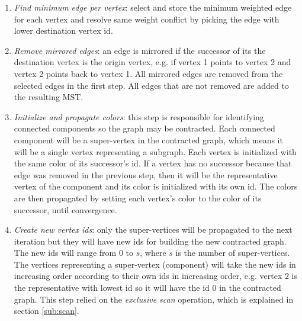 \begin{enumerate}
	\item \emph{Find minimum edge per vertex}: select and store the minimum weighted edge for each vertex and resolve same weight conflict by picking the edge with lower destination vertex id.

	\item \emph{Remove mirrored edges}: an edge is mirrored if the successor of its the destination vertex is the origin vertex, e.g. if vertex 1 points to vertex 2 and vertex 2 points back to vertex 1.
	All mirrored edges are removed from the selected edges in the first step. All edges that are not removed are added to the resulting MST.

	\item \emph{Initialize and propagate colors}: this step is responsible for identifying connected components so the graph may be contracted.
	Each connected component will be a super-vertex in the contracted graph, which means it will be a single vertex representing a subgraph.
	Each vertex is initialized with the same color of its successor's id.
	If a vertex has no successor because that edge was removed in the previous step, then it will be the representative vertex of the component and its color is initialized with its own id.
	The colors are then propagated by setting each vertex's color to the color of its successor, until convergence.

	\item \emph{Create new vertex ids}: only the super-vertices will be propagated to the next iteration but they will have new ids for building the new contracted graph.
	The new ids will range from $0$ to $s$, where $s$ is the number of super-vertices.
	The vertices representing a super-vertex (component) will take the new ids in increasing order according to their own ids in increasing order, e.g. vertex $2$ is the representative with lowest id so it will have the id $0$ in the contracted graph.
	This step relied on the \emph{exclusive scan} operation, which is explained in section \ref{sub:scan}.


\end{enumerate}
